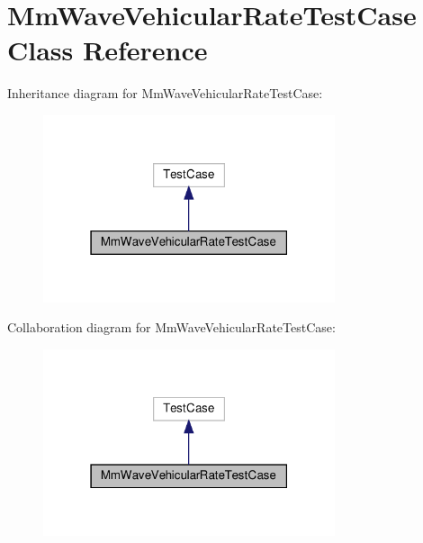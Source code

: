 \hypertarget{classMmWaveVehicularRateTestCase}{}\section{Mm\+Wave\+Vehicular\+Rate\+Test\+Case Class Reference}
\label{classMmWaveVehicularRateTestCase}


Inheritance diagram for Mm\+Wave\+Vehicular\+Rate\+Test\+Case\+:
\nopagebreak
\begin{figure}[H]
\begin{center}
\leavevmode
\includegraphics[width=243pt]{classMmWaveVehicularRateTestCase__inherit__graph}
\end{center}
\end{figure}


Collaboration diagram for Mm\+Wave\+Vehicular\+Rate\+Test\+Case\+:
\nopagebreak
\begin{figure}[H]
\begin{center}
\leavevmode
\includegraphics[width=243pt]{classMmWaveVehicularRateTestCase__coll__graph}
\end{center}
\end{figure}
